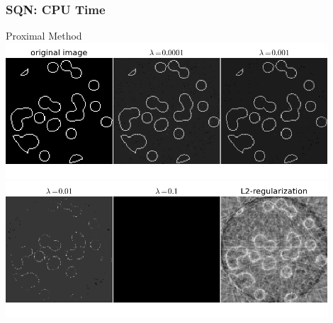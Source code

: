 \documentclass[10pt]{beamer}
\begin{document}
\begin{frame}\frametitle{SQN: CPU Time}
    \resizebox{0.85\linewidth}{!}{}
\end{frame}

\begin{frame}{Proximal Method}
	\centering\includegraphics[width=0.9\textwidth]{lambda1.png}\\
	\centering\includegraphics[width=0.9\textwidth]{lambda2.png}

\end{frame}
\end{document}
